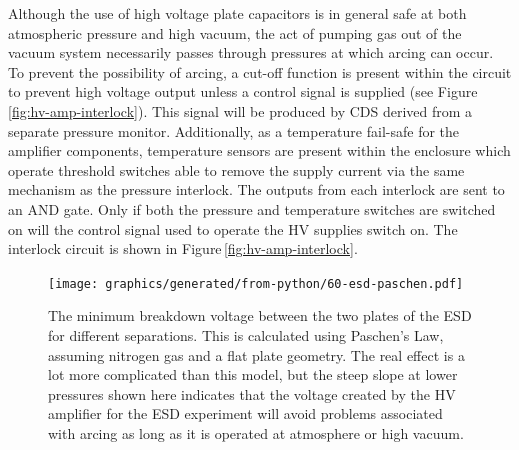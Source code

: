 Although the use of high voltage plate capacitors is in general safe at both atmospheric pressure and high vacuum, the act of pumping gas out of the vacuum system necessarily passes through pressures at which arcing can occur. To prevent the possibility of arcing, a cut-off function is present within the circuit to prevent high voltage output unless a control signal is supplied (see Figure\,\ref{fig:hv-amp-interlock}). This signal will be produced by \gls{CDS} derived from a separate pressure monitor. Additionally, as a temperature fail-safe for the amplifier components, temperature sensors are present within the enclosure which operate threshold switches able to remove the supply current via the same mechanism as the pressure interlock. The outputs from each interlock are sent to an AND gate. Only if both the pressure and temperature switches are switched on will the control signal used to operate the \gls{HV} supplies switch on. The interlock circuit is shown in Figure\,\ref{fig:hv-amp-interlock}.

\begin{figure}
  \centering
  \texttt{[image: graphics/generated/from-python/60-esd-paschen.pdf]}
  \caption[Minimum breakdown voltage between the two plates of the electrostatic drive for different separations]{\label{fig:esd-paschen}The minimum breakdown voltage between the two plates of the \gls{ESD} for different separations. This is calculated using Paschen's Law, assuming nitrogen gas and a flat plate geometry. The real effect is a lot more complicated than this model, but the steep slope at lower pressures shown here indicates that the voltage created by the \gls{HV} amplifier for the \gls{ESD} experiment will avoid problems associated with arcing as long as it is operated at atmosphere or high vacuum.}
\end{figure}

